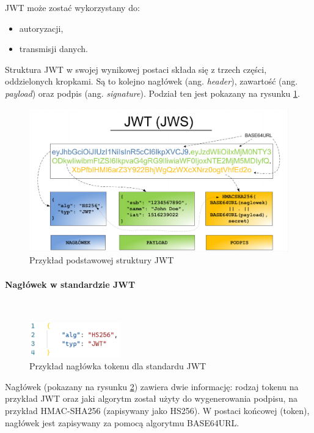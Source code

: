 \documentclass[12pt]{article}
\newcommand{\myparagraph}[1]{\paragraph{#1}\mbox{}\\}
\numberwithin{figure}{section}
\begin{document}
\begin{sloppypar}
JWT może zostać wykorzystany do:
\begin{itemize}
    \item autoryzacji,
    \item transmisji danych.
\end{itemize}
    
Struktura JWT w swojej wynikowej postaci składa się z trzech części, oddzielonych kropkami. Są to kolejno nagłówek (ang. \textit{header}), zawartość (ang. \textit{payload}) oraz podpis (ang. \textit{signature}). Podział ten jest pokazany na rysunku \ref{fig:jwt}.
    
\begin{figure}[H] 
    \centering
    \includegraphics[width=1\textwidth]{images/chapter_3/jwt.png}
    \caption{Przykład podstawowej struktury JWT \cite{sekurak-jwt}}
    \label{fig:jwt}
\end{figure}
    
    \myparagraph{Nagłówek w standardzie JWT}
    \begin{figure}[H] 
     	\centering
    	\includegraphics[width=0.35\textwidth]{images/chapter_3/jwt-header.png}
    	\caption{Przykład nagłówka tokenu dla standardu JWT}
    	\label{fig:jwt-header}
    \end{figure}
    
    Nagłówek (pokazany na rysunku \ref{fig:jwt-header}) zawiera dwie informację: rodzaj tokenu na przykład JWT oraz jaki algorytm został użyty do wygenerowania podpisu, na przykład HMAC-SHA256 (zapisywany jako HS256). W postaci końcowej (token), nagłówek jest zapisywany za pomocą algorytmu BASE64URL.
    

\end{sloppypar}
\end{document}
